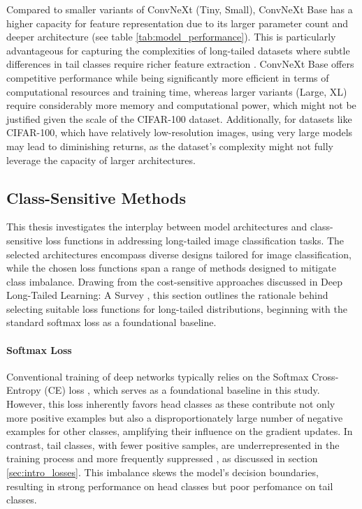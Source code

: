 Compared to smaller variants of ConvNeXt (Tiny, Small), ConvNeXt Base has a higher capacity for feature representation due to its larger parameter count and deeper architecture (see table \ref{tab:model_performance}). This is particularly advantageous for capturing the complexities of long-tailed datasets where subtle differences in tail classes require richer feature extraction \cite{liu2022convnet2020s}. ConvNeXt Base offers competitive performance while being significantly more efficient in terms of computational resources and training time, whereas larger variants (Large, XL) require considerably more memory and computational power, which might not be justified given the scale of the CIFAR-100 dataset. Additionally, for datasets like CIFAR-100, which have relatively low-resolution images, using very large models may lead to diminishing returns, as the dataset's complexity might not fully leverage the capacity of larger architectures.


\subsection{Class-Sensitive Methods}
\label{sec:loss_selection}
This thesis investigates the interplay between model architectures and class-sensitive loss functions in addressing long-tailed image classification tasks. The selected architectures encompass diverse designs tailored for image classification, while the chosen loss functions span a range of methods designed to mitigate class imbalance. Drawing from the cost-sensitive approaches discussed in Deep Long-Tailed Learning: A Survey \cite{zhang2023deep}, this section outlines the rationale behind selecting suitable loss functions for long-tailed distributions, beginning with the standard softmax loss as a foundational baseline.

\paragraph{Softmax Loss}

Conventional training of deep networks typically relies on the Softmax Cross-Entropy (CE) loss \cite{zhang2023deep}, which serves as a foundational baseline in this study. However, this loss inherently favors head classes as these contribute not only more positive examples but also a disproportionately large number of negative examples for other classes, amplifying their influence on the gradient updates. In contrast, tail classes, with fewer positive samples, are underrepresented in the training process and more frequently suppressed \cite{zhang2023deep, lin2018focallossdenseobject}, as discussed in section \ref{sec:intro_losses}. This imbalance skews the model's decision boundaries, resulting in strong performance on head classes but poor perfomance on tail classes.


